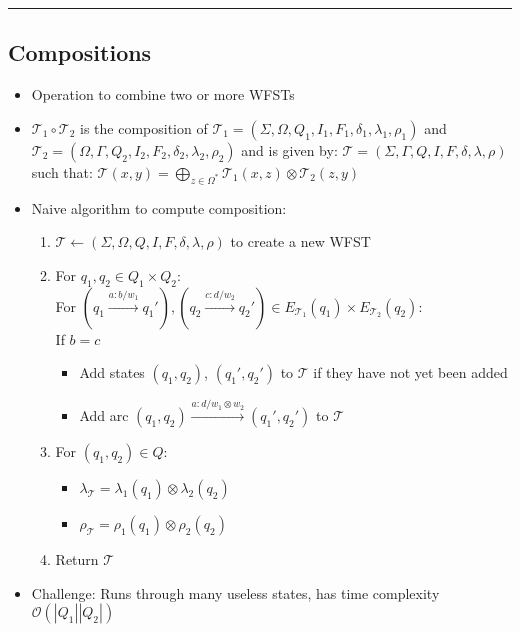 {\color{black}\hrule height 0.001mm}

\subsection*{Compositions}
\begin{itemize}
    \item Operation to combine two or more WFSTs
    \item $\mathcal{T}_1 \circ \mathcal{T}_2$ is the composition of $\mathcal{T}_1 = (\Sigma, \Omega, Q_1, I_1, F_1, \delta_1, \lambda_1, \rho_1)$ and $\mathcal{T}_2 = (\Omega, \Gamma, Q_2, I_2, F_2, \delta_2, \lambda_2, \rho_2)$ and is given by:
    $
    \mathcal{T} = (\Sigma, \Gamma, Q, I, F, \delta, \lambda, \rho)
    $
    such that:
    $
    \mathcal{T}(x, y) = \bigoplus_{z \in \Omega^*} \mathcal{T}_1(x, z) \otimes \mathcal{T}_2(z, y)
    $
    \item Naive algorithm to compute composition:
    \begin{enumerate}
        \item $\mathcal{T} \gets (\Sigma, \Omega, Q, I, F, \delta, \lambda, \rho)$ to create a new WFST
        \item For $q_1, q_2 \in Q_1 \times Q_2$:\\
        For
        $
        (q_1 \xrightarrow{a:b/w_1} q_1'), (q_2 \xrightarrow{c:d/w_2} q_2') \in  E_{\mathcal{T}_1}(q_1) \times E_{\mathcal{T}_2}(q_2):
        $\\
        If $b=c$
        \begin{itemize}
            \item Add states $(q_1, q_2)$, $(q_1', q_2')$ to $\mathcal{T}$ if they have not yet been added
            \item Add arc $(q_1, q_2) \xrightarrow{a:d/w_1 \otimes w_2} (q_1', q_2')$ to $\mathcal{T}$
        \end{itemize}
        \item For $(q_1, q_2) \in Q$:
        \begin{itemize}
            \item $
            \lambda_\mathcal{T} = \lambda_1(q_1) \otimes \lambda_2(q_2)
            $
            \item $
            \rho_\mathcal{T} = \rho_1(q_1) \otimes \rho_2(q_2)
            $
        \end{itemize}
        \item Return $\mathcal{T}$
    \end{enumerate}
    \item Challenge: Runs through many useless states, has time complexity $\mathcal{O}(|Q_1||Q_2|)$

\end{itemize}
